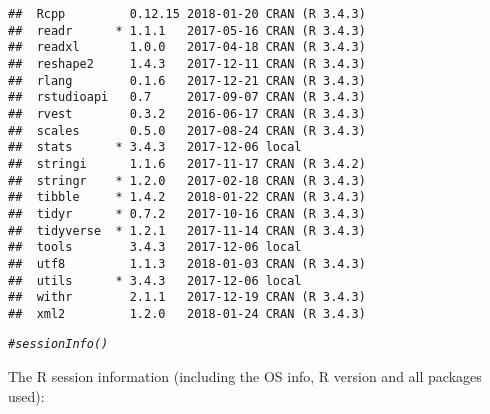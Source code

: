 \documentclass{article}\usepackage[]{graphicx}\usepackage[]{color}
\makeatletter
\newcommand{\hlcom}[1]{\textcolor[rgb]{0.678,0.584,0.686}{\textit{#1}}}%
\newenvironment{kframe}{%
 \def\at@end@of@kframe{}%
 \ifinner\ifhmode%
  \def\at@end@of@kframe{\end{minipage}}%
  \begin{minipage}{\columnwidth}%
 \fi\fi%
 \def\FrameCommand##1{\hskip\@totalleftmargin \hskip-\fboxsep
 \colorbox{shadecolor}{##1}\hskip-\fboxsep
     \hskip-\linewidth \hskip-\@totalleftmargin \hskip\columnwidth}%
 \MakeFramed {\advance\hsize-\width
   \@totalleftmargin\z@ \linewidth\hsize
   \@setminipage}}%
 {\par\unskip\endMakeFramed%
 \at@end@of@kframe}
\newenvironment{knitrout}{}{} %
\makeatother
\begin{document}
\begin{knitrout}
\begin{kframe}
\begin{verbatim}
##  Rcpp         0.12.15 2018-01-20 CRAN (R 3.4.3)
##  readr      * 1.1.1   2017-05-16 CRAN (R 3.4.3)
##  readxl       1.0.0   2017-04-18 CRAN (R 3.4.3)
##  reshape2     1.4.3   2017-12-11 CRAN (R 3.4.3)
##  rlang        0.1.6   2017-12-21 CRAN (R 3.4.3)
##  rstudioapi   0.7     2017-09-07 CRAN (R 3.4.3)
##  rvest        0.3.2   2016-06-17 CRAN (R 3.4.3)
##  scales       0.5.0   2017-08-24 CRAN (R 3.4.3)
##  stats      * 3.4.3   2017-12-06 local         
##  stringi      1.1.6   2017-11-17 CRAN (R 3.4.2)
##  stringr    * 1.2.0   2017-02-18 CRAN (R 3.4.3)
##  tibble     * 1.4.2   2018-01-22 CRAN (R 3.4.3)
##  tidyr      * 0.7.2   2017-10-16 CRAN (R 3.4.3)
##  tidyverse  * 1.2.1   2017-11-14 CRAN (R 3.4.3)
##  tools        3.4.3   2017-12-06 local         
##  utf8         1.1.3   2018-01-03 CRAN (R 3.4.3)
##  utils      * 3.4.3   2017-12-06 local         
##  withr        2.1.1   2017-12-19 CRAN (R 3.4.3)
##  xml2         1.2.0   2018-01-24 CRAN (R 3.4.3)
\end{verbatim}
\begin{alltt}
\hlcom{#sessionInfo() }
\end{alltt}
\end{kframe}
\end{knitrout}

The R session information (including the OS info, R version and all
packages used):
\end{document}
